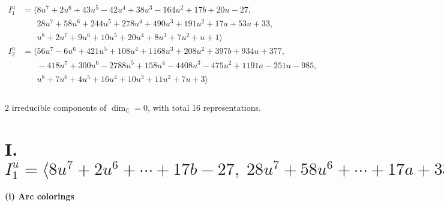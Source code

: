 \documentclass[1p]{elsarticle_modified}
\theoremstyle{definition}
\begin{document}
\begin{align*}
I^u_{1}&=\langle 
8 u^7+2 u^6+43 u^5-42 u^4+38 u^3-164 u^2+17 b+20 u-27,\\
\phantom{I^u_{1}}&\phantom{= \langle  }28 u^7+58 u^6+244 u^5+278 u^4+490 u^3+191 u^2+17 a+53 u+33,\\
\phantom{I^u_{1}}&\phantom{= \langle  }u^8+2 u^7+9 u^6+10 u^5+20 u^4+8 u^3+7 u^2+u+1\rangle \\
I^u_{2}&=\langle 
56 u^7-6 u^6+421 u^5+108 u^4+1168 u^3+208 u^2+397 b+934 u+377,\\
\phantom{I^u_{2}}&\phantom{= \langle  }-418 u^7+300 u^6-2788 u^5+158 u^4-4408 u^3-475 u^2+1191 a-251 u-985,\\
\phantom{I^u_{2}}&\phantom{= \langle  }u^8+7 u^6+4 u^5+16 u^4+10 u^3+11 u^2+7 u+3\rangle \\
\\
\end{align*}
\raggedright * 2 irreducible components of $\dim_{\mathbb{C}}=0$, with total 16 representations.\\
\newpage
\renewcommand{\arraystretch}{1}
\centering \section*{I. $I^u_{1}= \langle 8 u^7+2 u^6+\cdots+17 b-27,\;28 u^7+58 u^6+\cdots+17 a+33,\;u^8+2 u^7+\cdots+u+1 \rangle$}
\flushleft \textbf{(i) Arc colorings}\\
\end{document}
